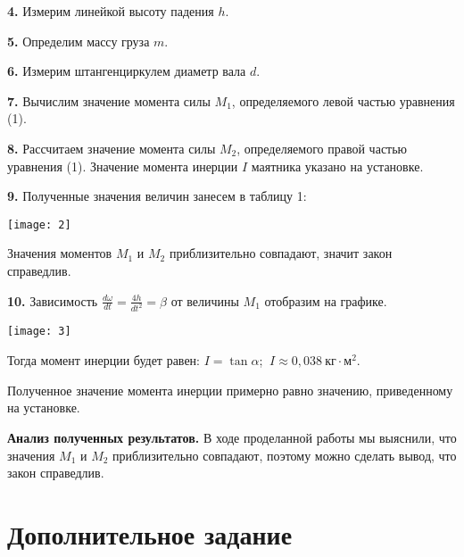 \documentclass{article}
\begin{document}
\textbf{4.} Измерим линейкой высоту падения $h$.

\vspace{0.5cm}

\textbf{5.} Определим массу груза $m$.

\vspace{0.5cm}

\textbf{6.} Измерим штангенциркулем диаметр вала $d$.

\vspace{0.5cm}

\textbf{7.} Вычислим значение момента силы $M_1$, определяемого левой
частью уравнения (1).

\vspace{0.5cm}

\textbf{8.} Рассчитаем значение момента силы $M_2$, определяемого
правой частью уравнения (1). Значение момента инерции $I$
маятника указано на установке.

\vspace{0.5cm}

\textbf{9.} Полученные значения величин занесем в таблицу 1:

\texttt{[image: 2]}

Значения моментов $M_1$ и $M_2$ приблизительно
совпадают, значит закон справедлив.

\vspace{0.5cm}

\textbf{10.} Зависимость $\frac{d\omega}{dt}=\frac{4h}{dt^2}=\beta$ от 
величины $M_1$ отобразим на графике.

\vspace{0.6cm}

\texttt{[image: 3]}

\vspace{0.6cm}

Тогда момент инерции будет равен: $I=\tan{\alpha}$;
$~ I\approx 0,038~\text{кг}\cdot \text{м}^2$.

Полученное значение момента инерции примерно равно значению,
приведенному на установке.

\textbf{Анализ полученных результатов.} 
В ходе проделанной работы мы выяснили, что значения
$M_1$ и $M_2$ приблизительно совпадают, поэтому можно сделать вывод, 
что закон справедлив.

\section{Дополнительное задание}
\end{document}

